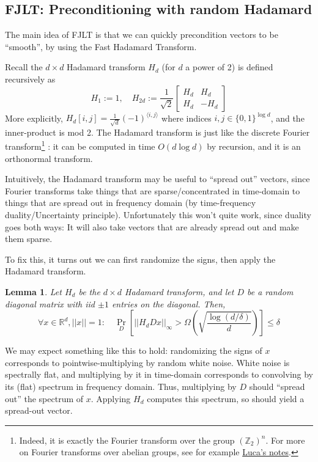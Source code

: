 \documentclass[]{article}
\newtheorem{lemma}{Lemma}
\newcommand{\1}{\mathbbm{1}}
\newcommand{\x}{\times}
\newcommand{\Z}{\mathbb{Z}}
\newcommand{\R}{\mathbb{R}}
\renewcommand{\epsilon}{\varepsilon}
\newcommand{\bmqty}[1]{\begin{bmatrix}#1\end{bmatrix}}
\newcommand{\innp}[1]{\langle #1 \rangle}
\begin{document}

\subsection{FJLT: Preconditioning with random Hadamard}
The main idea of FJLT is that we can quickly precondition vectors to be
``smooth'', by using the Fast Hadamard Transform.

Recall the $d \x d$ Hadamard transform $H_d$ (for $d$ a power of 2) is defined
recursively as
$$H_1 :=  1
,\quad
H_{2d} := \frac{1}{\sqrt{2}} \bmqty{H_d & H_d\\H_d & -H_d}$$
More explicitly, $H_d[i,j] = \frac{1}{\sqrt{d}} (-1)^{\innp{i, j}}$
where indices $i,j \in \{0, 1\}^{\log d}$, and the inner-product is mod 2.
The Hadamard transform is just like the discrete Fourier transform\footnote{Indeed, it is exactly the Fourier transform over the group
    $(\Z_2)^n$. For more on Fourier transforms over abelian groups, see for
    example \href{https://lucatrevisan.wordpress.com/2016/03/16/cs294-lecture-15-abelian-cayley-graphs/}{Luca's
    notes}.}
: it can be computed in
time $O(d\log d)$ by recursion, and it is an orthonormal transform.

Intuitively, the Hadamard transform may be useful to ``spread out'' vectors,
since Fourier transforms take things that are sparse/concentrated in time-domain
to things that are spread out in frequency domain (by time-frequency duality/Uncertainty principle).
Unfortunately this won't quite work, since duality goes both ways: It will also
take vectors that are already spread out and make them sparse.

To fix this, it turns out we can first randomize the signs, then apply the
Hadamard transform.

\begin{lemma}
\label{lem:Hadamard}
Let $H_d$ be the $d \x d$ Hadamard transform, and let $D$ be a random
diagonal matrix with iid $\pm 1$ entries on the diagonal.
Then,
$$\forall x \in \R^d, ||x||=1: \quad
\Pr_{D}[
||H_d D x||_\infty >
\Omega(\sqrt{\frac{\log(d/\delta)}{d}})
]
\leq \delta$$
\end{lemma}

We may expect something like this to hold: randomizing the signs of $x$
corresponds to
pointwise-multiplying by random white noise. White noise is
spectrally flat, and multiplying by it in time-domain corresponds to
convolving by its (flat) spectrum in frequency domain.
Thus, multiplying by $D$ should ``spread out'' the spectrum of $x$.
Applying $H_d$ computes this spectrum, so should yield a spread-out vector.
\end{document}
